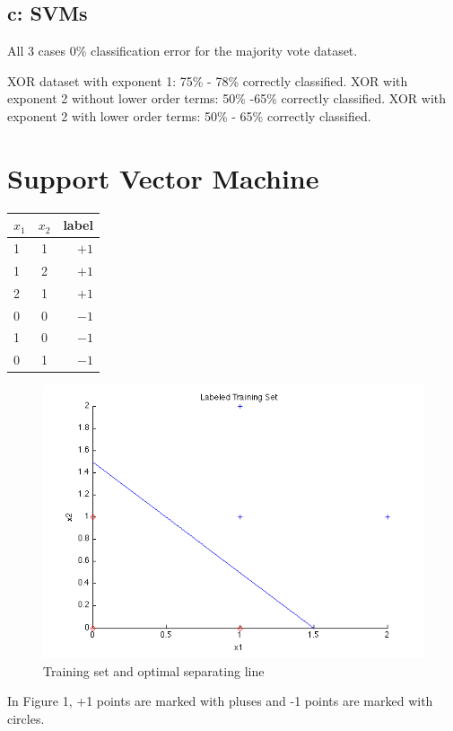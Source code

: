 \documentclass{article}
\begin{document}
\subsection*{c: SVMs}

All 3 cases 0\% classification error for the majority vote dataset. 

XOR dataset with exponent 1: 75\% - 78\% correctly classified.
XOR with exponent 2 without lower order terms: 50\% -65\% correctly classified. 
XOR with exponent 2 with lower order terms: 50\% - 65\% correctly classified. 


\section{Support Vector Machine}

\begin{center}
  \begin{tabular}{ | l | c | r |}
   \hline
    $x_1$ & $x_2$ & label \\ \hline
    1 & 1 & $+1$\\ 
    1 & 2 & $+1$ \\ 
    2 & 1 & $+1$ \\
    0 & 0 & $-1$ \\ 
    1 & 0 & $-1$ \\ 
    0 & 1 & $-1$ \\ 
    \hline
  \end{tabular}
\end{center}


\begin{figure}[H]
  \centering
      \includegraphics[]{SVMplot}
  \caption{Training set and optimal separating line}
\end{figure}

In Figure 1, +1 points are marked with pluses and -1 points are marked with circles. 
\end{document}
